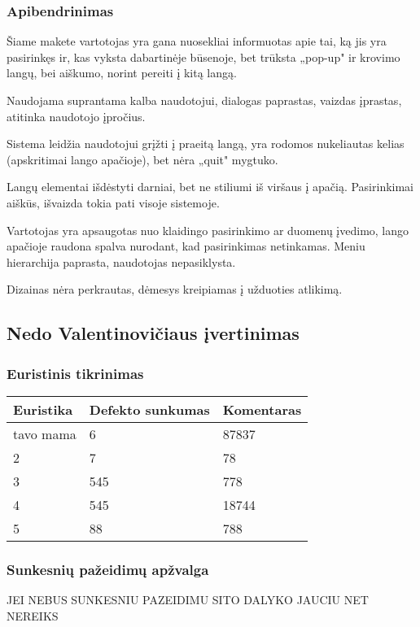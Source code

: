 \documentclass{VUMIFPSkursinis}
\begin{document}
\subsubsection{Apibendrinimas}
Šiame makete vartotojas yra gana nuosekliai informuotas apie tai, ką jis yra pasirinkęs ir, kas vyksta dabartinėje būsenoje, bet trūksta „pop-up" ir krovimo langų, bei aiškumo, norint pereiti į kitą langą.

Naudojama suprantama kalba naudotojui, dialogas paprastas, vaizdas įprastas, atitinka naudotojo įpročius.

Sistema leidžia naudotojui grįžti į praeitą langą, yra rodomos nukeliautas kelias (apskritimai lango apačioje), bet nėra „quit" mygtuko.

Langų elementai išdėstyti darniai, bet ne stiliumi iš viršaus į apačią. Pasirinkimai aiškūs, išvaizda tokia pati visoje sistemoje.

Vartotojas yra apsaugotas nuo klaidingo pasirinkimo ar duomenų įvedimo, lango apačioje raudona spalva nurodant, kad pasirinkimas netinkamas. Meniu hierarchija paprasta, naudotojas nepasiklysta.

Dizainas nėra perkrautas, dėmesys kreipiamas į užduoties atlikimą.

\subsection{Nedo Valentinovičiaus įvertinimas}
\subsubsection{Euristinis tikrinimas}
\begin{center}
 \begin{tabular}{|| p{4cm} | p{4cm} | p{8cm} ||} 
 \hline
 Euristika & Defekto sunkumas & Komentaras \\
 \hline\hline
 tavo mama & 6 & 87837 \\ 
 \hline
 2 & 7 & 78 \\
 \hline
 3 & 545 & 778 \\
 \hline
 4 & 545 & 18744 \\
 \hline
 5 & 88 & 788 \\  %
 \hline                 %
\end{tabular}	
\end{center}

\subsubsection{Sunkesnių pažeidimų apžvalga}
JEI NEBUS SUNKESNIU PAZEIDIMU SITO DALYKO JAUCIU NET NEREIKS
\end{document}
